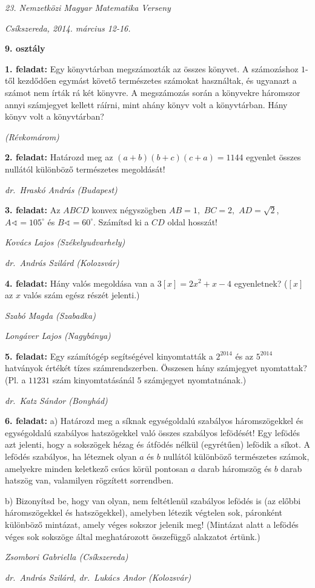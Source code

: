 \documentclass[a4paper,10pt]{article}
\newcommand{\ki}[2]{\hfill {\it #1 (#2)}\medskip}
\begin{document}
\begin{center} \Large {\em 23. Nemzetközi Magyar Matematika Verseny} \end{center}
\begin{center} \large{\em Csíkszereda, 2014. március 12-16.} \end{center}
\smallskip
\begin{center} \large{\bf 9. osztály} \end{center}
\bigskip 

{\bf 1. feladat: } Egy könyvtárban megszámozták az összes könyvet. A
számozáshoz $1$-től kez\-dő\-dő\-en egymást követő
természetes szá\-mo\-kat használtak, és ugyanazt a számot
nem írták rá két könyvre. A megszámozás során a
könyvekre háromszor annyi számjegyet kellett
ráírni, mint ahány könyv volt a könyvtárban.
Hány könyv volt a könyvtárban?

\ki{}{Révkomárom}\medskip

{\bf 2. feladat: } Határozd meg az $(a+b)(b+c)(c+a)=1144$ egyenlet összes
nullától különböző természetes megoldását!

\ki{dr.~Hraskó András}{Budapest}\medskip

{\bf 3. feladat: } Az $ABCD$ konvex négyszögben $AB=1,$ $BC=2,$ $AD = \sqrt{2}$,
$A\sphericalangle = 105^{\circ}$ és $B\sphericalangle  = 60^\circ$.
Számítsd ki a $CD$ oldal hosszát!


\ki{Kovács Lajos}{Székelyudvarhely}

\ki{dr.~András Szilárd}{Kolozsvár}\medskip

{\bf 4. feladat: } Hány valós megoldása van a $3\left[  x\right]
=2x^{2}+x-4$ egyenletnek? ($\left[  x\right]  $ az $x$ valós
szám egész részét jelenti.)

\ki{Szabó Magda}{Szabadka}

\ki{Longáver Lajos}{Nagybánya}\medskip

{\bf 5. feladat: } Egy számítógép segítségével kinyomtatták a
$2^{2014}$ és az $5^{2014}$ hatványok értékét
tízes számrendszerben. Összesen hány számjegyet
nyomtattak? (Pl. a $11231$ szám kinyomtatásánál $5$
számjegyet nyomtatnának.)

\ki{dr.~Katz Sándor}{Bonyhád}\medskip

{\bf 6. feladat: } a) Határozd meg a síknak egységoldalú szabályos
háromszögekkel és egy\-ség\-oldalú szabályos
hatszögekkel való összes szabályos lefödését! Egy
lefödés azt jelenti, hogy a sokszögek hézag és
átfödés nélkül (egyrétűen) lefödik a síkot. A
lefödés sza\-bá\-lyos, ha léteznek olyan $a$ és $b$
nullától különböző természetes számok, amelyekre
minden keletkező csúcs körül pontosan $a$ darab
háromszög és $b$ darab hatszög van, valamilyen rögzített
sorrendben.

\smallskip
b) Bizonyítsd be, hogy van olyan, nem feltétlenül szabályos
lefödés is (az előbbi háromszögekkel és
hatszögekkel), amelyben létezik végtelen sok, páron\-ként
különböző mintázat, amely véges sokszor jelenik meg!
(Min\-tá\-zat alatt a lefödés véges sok sokszöge által
megha\-tá\-ro\-zott összefüggő alakzatot értünk.)



\ki{Zsombori Gabriella}{Csíkszereda}

\ki{dr.~András Szilárd, dr.~Lukács Andor}{Kolozsvár}
\end{document}
